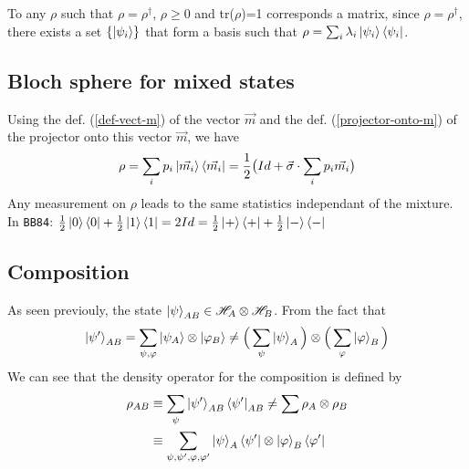 \documentclass{article}
\begin{document}
To any $\rho$ such that $\rho=\rho^\dagger$, $\rho \geq 0$ and tr($\rho$)=1
corresponds a matrix, since $\rho=\rho^\dagger$, there exists a set
$\{\ket{\psi_i}\}$ that form a basis such that
$\rho=\sum_i\lambda_i\ket{\psi_i}\bra{\psi_i}$.


\subsection{Bloch sphere for mixed states}
Using the def. (\ref{def-vect-m}) of the vector $\vec{m}$ and the def.
(\ref{projector-onto-m}) of the projector onto this vector $\vec{m}$, we have
\begin{equation}
    \rho = \sum_ip_i\ket{\vec{m_i}}\bra{\vec{m_i}} = \frac{1}{2}\big(Id+\vec{\sigma}\cdot\sum_ip_i\vec{m_i}\big)
\end{equation}
Any measurement on $\rho$ leads to the same statistics independant of the
mixture.\\
In \texttt{BB84}:
$
\frac{1}{2}\ket{0}\bra{0} + \frac{1}{2} \ket{1}\bra{1}
=2Id=
\frac{1}{2}\ket{+}\bra{+} + \frac{1}{2} \ket{-}\bra{-}
$

\subsection{Composition}
As seen previouly, the state $\ket{\psi}_{AB} \in \mathscr{H}_A \otimes
\mathscr{H}_B$. From the fact that
\begin{equation}
    \ket{\psi'}_{AB} = \sum_{\psi, \varphi}\ket{\psi_A}\otimes\ket{\varphi_B}
    \neq \Big(\sum_{\psi}\ket{\psi}_A\Big) \otimes \Big(\sum_{\varphi}\ket{\varphi}_B\Big)
\end{equation}
We can see that the density operator for the composition is defined by
\begin{equation}
    \begin{aligned}
        \rho_{AB}
            & \equiv \sum_{\psi}\ket{\psi'}_{AB}\bra{\psi'}_{AB} \neq \sum \rho_A \otimes \rho_B \\
            & \equiv \sum_{\psi,\psi',\varphi,\varphi'}\ket{\psi}_A\bra{\psi'}\otimes\ket{\varphi}_B\bra{\varphi'}
    \end{aligned}
\end{equation}
\end{document}
